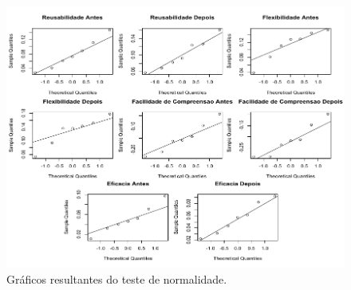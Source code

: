 


\begin{figure}[h]
	\centering
	\caption{Gráficos resultantes do teste de normalidade.}
	\label{fig:qq_plot_experimento1}
	\includegraphics[scale=0.9]{images/QQPlotDia140116}
	\fautor
\end{figure}

